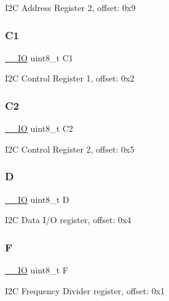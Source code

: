 I2C Address Register 2, offset\+: 0x9 \mbox{\label{struct_i2_c___type_ad54aa92be9fc988e74d55d2d3daae8ad}} 
\subsubsection{\texorpdfstring{C1}{C1}}
{\footnotesize\ttfamily \mbox{\hyperlink{core__cm0plus_8h_aec43007d9998a0a0e01faede4133d6be}{\+\_\+\+\_\+\+IO}} uint8\+\_\+t C1}

I2C Control Register 1, offset\+: 0x2 \mbox{\label{struct_i2_c___type_a4f920936a8fc32483b3ebd9b0674b450}} 
\subsubsection{\texorpdfstring{C2}{C2}}
{\footnotesize\ttfamily \mbox{\hyperlink{core__cm0plus_8h_aec43007d9998a0a0e01faede4133d6be}{\+\_\+\+\_\+\+IO}} uint8\+\_\+t C2}

I2C Control Register 2, offset\+: 0x5 \mbox{\label{struct_i2_c___type_a6c0edcafd91c3baa698617799de6ec35}} 
\subsubsection{\texorpdfstring{D}{D}}
{\footnotesize\ttfamily \mbox{\hyperlink{core__cm0plus_8h_aec43007d9998a0a0e01faede4133d6be}{\+\_\+\+\_\+\+IO}} uint8\+\_\+t D}

I2C Data I/O register, offset\+: 0x4 \mbox{\label{struct_i2_c___type_a59168eda4690de8b4b61d6b940d010a6}} 
\subsubsection{\texorpdfstring{F}{F}}
{\footnotesize\ttfamily \mbox{\hyperlink{core__cm0plus_8h_aec43007d9998a0a0e01faede4133d6be}{\+\_\+\+\_\+\+IO}} uint8\+\_\+t F}

I2C Frequency Divider register, offset\+: 0x1 \mbox{\label{struct_i2_c___type_a1150d16f9855062058c3b12511dcd188}} 
